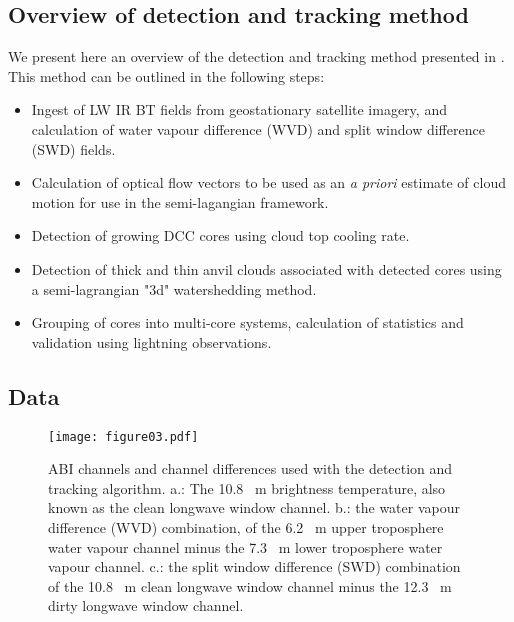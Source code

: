 \subsection{Overview of detection and tracking method}

We present here an overview of the detection and tracking method presented in \citet{jones_semi-lagrangian_2022}.
This method can be outlined in the following steps:

\begin{itemize}
    \item Ingest of LW IR BT fields from geostationary satellite imagery, and calculation of water vapour difference (WVD) and split window difference (SWD) fields.
    \item Calculation of optical flow vectors to be used as an \textit{a priori} estimate of cloud motion for use in the semi-lagangian framework.
    \item Detection of growing DCC cores using cloud top cooling rate.
    \item Detection of thick and thin anvil clouds associated with detected cores using a semi-lagrangian "3d" watershedding method. 
    \item Grouping of cores into multi-core systems, calculation of statistics and validation using lightning observations.
\end{itemize}

\subsection{Data}

\begin{figure}[t]
    \centering
    \texttt{[image: figure03.pdf]}
    \caption{ABI channels and channel differences used with the detection and tracking algorithm. a.: The 10.8 \unit{\mu m} brightness temperature, also known as the clean longwave window channel. b.: the water vapour difference (WVD) combination, of the 6.2 \unit{\mu m} upper troposphere water vapour channel minus the 7.3 \unit{\mu m} lower troposphere water vapour channel. c.: the split window difference (SWD) combination of the 10.8 \unit{\mu m} clean longwave window channel minus the 12.3 \unit{\mu m} dirty longwave window channel.}
    \label{fig:abi_channels}
\end{figure}

